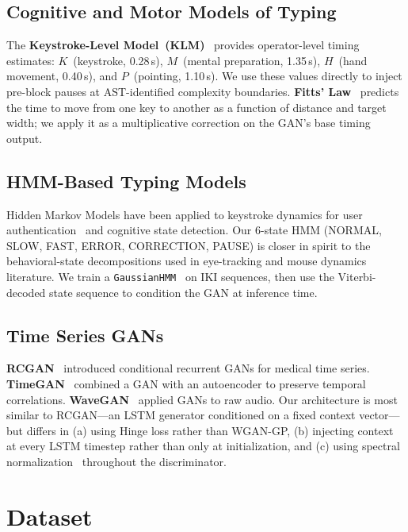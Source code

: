 \documentclass[sigconf,nonacm]{acmart}
\begin{document}
\subsection{Cognitive and Motor Models of Typing}

The \textbf{Keystroke-Level Model~(KLM)}~\cite{card1980klm} provides operator-level
timing estimates: $K$~(keystroke, 0.28\,s), $M$~(mental preparation, 1.35\,s),
$H$~(hand movement, 0.40\,s), and $P$~(pointing, 1.10\,s).
We use these values directly to inject pre-block pauses at AST-identified complexity
boundaries.
\textbf{Fitts' Law}~\cite{fitts1954information} predicts the time to move from one key
to another as a function of distance and target width; we apply it as a multiplicative
correction on the GAN's base timing output.

\subsection{HMM-Based Typing Models}

Hidden Markov Models have been applied to keystroke dynamics for user
authentication~\cite{majaranta2009typing} and cognitive state detection.
Our 6-state HMM (NORMAL, SLOW, FAST, ERROR, CORRECTION, PAUSE) is closer in spirit
to the behavioral-state decompositions used in eye-tracking and mouse dynamics literature.
We train a \texttt{GaussianHMM}~\cite{hmmlearn} on IKI sequences, then use the
Viterbi-decoded state sequence to condition the GAN at inference time.

\subsection{Time Series GANs}

\textbf{RCGAN}~\cite{esteban2017rcgan} introduced conditional recurrent GANs for medical
time series.
\textbf{TimeGAN}~\cite{yoon2019timegan} combined a GAN with an autoencoder to preserve
temporal correlations.
\textbf{WaveGAN}~\cite{donahue2018wavegan} applied GANs to raw audio.
Our architecture is most similar to RCGAN---an LSTM generator conditioned on a fixed
context vector---but differs in (a) using Hinge loss rather than WGAN-GP, (b) injecting
context at every LSTM timestep rather than only at initialization, and (c) using spectral
normalization~\cite{miyato2018spectral} throughout the discriminator.


\section{Dataset}
\end{document}
